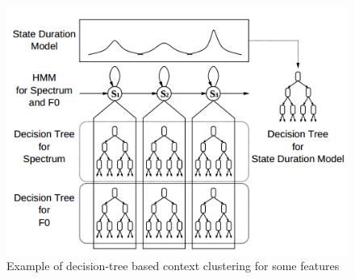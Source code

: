 \begin{figure}[htb]
	\begin{center}
	\includegraphics[width=1\textwidth]{img/decision-tree.png}
	\end{center}
	\caption{\label{decision-tree}Example of decision-tree based context clustering for some features \cite{Tokuda02anhmm-based}}
\end{figure}
